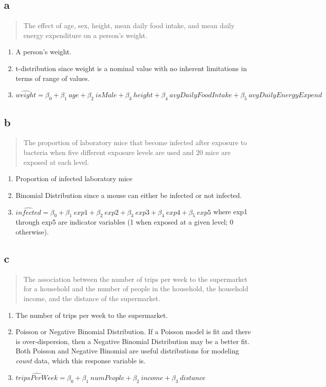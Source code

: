 \documentclass[11pt]{article}
\begin{document}
\subsection{a}
\label{sec:org6a3e66c}
\begin{quote}
The effect of age, sex, height, mean daily food intake, and mean daily energy
expenditure on a person's weight.
\end{quote}

\begin{enumerate}
\item A person's weight.
\item t-distribution since weight is a nominal value with no inherent limitations
in terms of range of values.
\item \(\hat{weight} = \beta_0 + \beta_1 \ age + \beta_2 \ isMale + \beta_3 \ height + \beta_4 \ avgDailyFoodIntake + \beta_5 \ avgDailyEnergyExpend\)
\end{enumerate}

\subsection{b}
\label{sec:orgf35bdc0}
\begin{quote}
The proportion of laboratory mice that become infected after exposure to
bacteria when five different exposure levels are used and 20 mice are exposed at
each level.
\end{quote}

\begin{enumerate}
\item Proportion of infected laboratory mice
\item Binomial Distribution since a mouse can either be infected or not infected.
\item \(\hat{infected} = \beta_0 + \beta_1 \ exp1 + \beta_2 \ exp2 + \beta_3 \
   exp3 + \beta_4 \ exp4 + \beta_5 \ exp5\) where exp1 through exp5 are indicator variables (1 when exposed at a given level; 0 otherwise).
\end{enumerate}

\subsection{c}
\label{sec:orgda0b6be}
\begin{quote}
The association between the number of trips per week to the supermarket for a
household and the number of people in the household, the household income, and
the distance of the supermarket.
\end{quote}

\begin{enumerate}
\item The number of trips per week to the supermarket.
\item Poisson or Negative Binomial Distribution. If a Poisson model is fit and
there is over-dispersion, then a Negative Binomial Distribution may be a
better fit. Both Poisson and Negative Binomial are useful distributions for
modeling \emph{count} data, which this response variable is.
\item \(\hat{tripsPerWeek} = \beta_0 + \beta_1 \ numPeople + \beta_2 \ income + \beta_3 \ distance\)
\end{enumerate}
\end{document}
